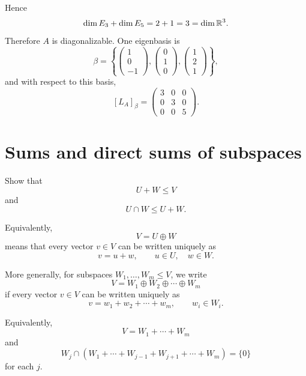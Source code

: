 \documentclass[11pt,openany]{article}
\begin{document}
\begin{example}
Hence
\[
\dim E_3+\dim E_5=2+1=3=\dim\mathbb{R}^3.
\]
Therefore $A$ is diagonalizable.  One eigenbasis is
\[
\beta=
\left\{
\begin{pmatrix}1\\0\\-1\end{pmatrix},
\begin{pmatrix}0\\1\\0\end{pmatrix},
\begin{pmatrix}1\\2\\1\end{pmatrix}
\right\},
\]
and with respect to this basis,
\[
[L_A]_{\beta}=
\begin{pmatrix}
	3&0&0\\
	0&3&0\\
	0&0&5
\end{pmatrix}.
\]
\end{example}


\section*{Sums and direct sums of subspaces}


\begin{exercise}
	Show that
	\[
	U+W\leq V
	\]
	and
	\[
	U\cap W\leq U+W.
	\]
\end{exercise}

\begin{remark}
Equivalently,
\[
V=U\oplus W
\]
means that every vector $v\in V$ can be written uniquely as
\[
v=u+w,
\qquad
u\in U,
\quad
w\in W.
\]

More generally, for subspaces $W_1,\dots,W_m\leq V$, we write
\[
V=W_1\oplus W_2\oplus\cdots\oplus W_m
\]
if every vector $v\in V$ can be written uniquely as
\[
v=w_1+w_2+\cdots+w_m,
\qquad
w_i\in W_i.
\]

Equivalently,
\[
V=W_1+\cdots+W_m
\]
and
\[
W_j\cap\left(W_1+\cdots+W_{j-1}+W_{j+1}+\cdots+W_m\right)=\{0\}
\]
for each $j$.
\end{remark}
\end{document}
